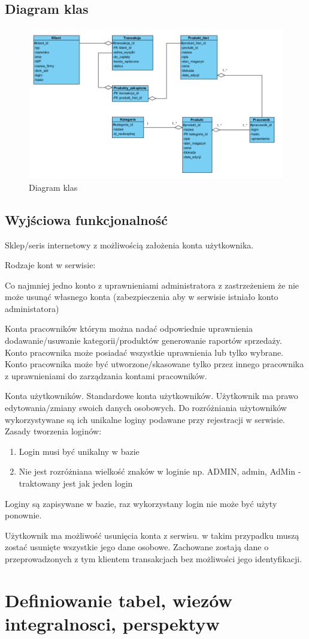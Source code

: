 \subsection{Diagram klas}
\begin{figure}[H]
	\centering
	\includegraphics[width=15 cm] {fig/klasy}
	\caption{Diagram klas}
	\label{fig:diagram klas}
\end{figure}
\subsection{Wyjściowa funkcjonalność}

Sklep/seris internetowy z możliwością założenia konta użytkownika.
	
Rodzaje kont w serwisie:
	
Co najmniej jedno konto z uprawnieniami administratora z zastrzeżeniem że nie może usunąć własnego konta (zabezpieczenia aby w serwisie istniało konto administatora)

Konta pracowników którym można nadać odpowiednie uprawnienia dodawanie/usuwanie kategorii/produktów generowanie raportów sprzedaży. Konto pracownika może posiadać wszystkie uprawnienia lub tylko wybrane. Konto pracownika może być utworzone/skasowane tylko przez innego pracownika z uprawnieniami do zarządzania kontami pracowników.

Konta użytkowników. Standardowe konta użytkowników. Użytkownik ma prawo edytowania/zmiany swoich danych osobowych. Do rozróżniania użytowników wykorzystywane są ich unikalne loginy podawane przy rejestracji w serwisie.
Zasady tworzenia loginów:
\begin{enumerate}
\item Login musi być unikalny w bazie
\item Nie jest rozróżniana wielkość znaków w loginie np. ADMIN, admin, AdMin - traktowany jest jak jeden login
\end{enumerate}
Loginy są zapisywane w bazie, raz wykorzystany login nie może być użyty ponownie.

Użytkownik ma możliwość usunięcia konta z serwisu. w takim przypadku muszą zostać usunięte wszystkie jego dane osobowe. Zachowane zostają dane o przeprowadzonych z tym klientem transakcjach bez możliwości jego identyfikacji.



	
\section{Definiowanie tabel, wiezów integralnosci, perspektyw}